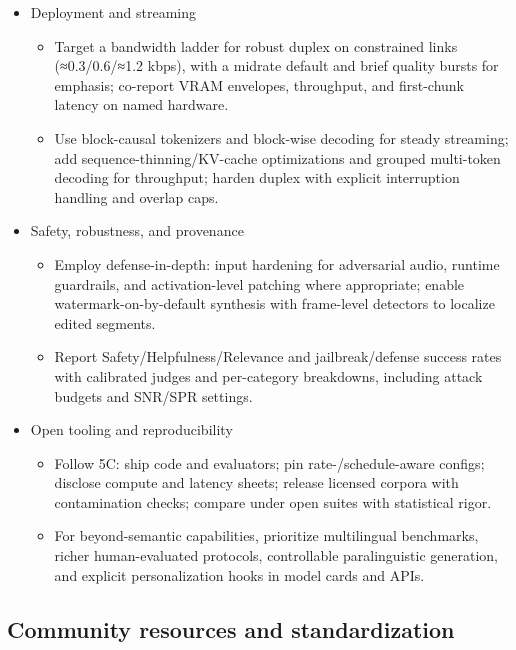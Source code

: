 \documentclass{article}
\begin{document}
\begin{itemize}
  \item Deployment and streaming
  \begin{itemize}
    \item Target a bandwidth ladder for robust duplex on constrained links (≈0.3/0.6/≈1.2 kbps), with a midrate default and brief quality bursts for emphasis; co-report VRAM envelopes, throughput, and first-chunk latency on named hardware.
    \item Use block-causal tokenizers and block-wise decoding for steady streaming; add sequence-thinning/KV-cache optimizations and grouped multi-token decoding for throughput; harden duplex with explicit interruption handling and overlap caps.
  \end{itemize}

  \item Safety, robustness, and provenance
  \begin{itemize}
    \item Employ defense-in-depth: input hardening for adversarial audio, runtime guardrails, and activation-level patching where appropriate; enable watermark-on-by-default synthesis with frame-level detectors to localize edited segments.
    \item Report Safety/Helpfulness/Relevance and jailbreak/defense success rates with calibrated judges and per-category breakdowns, including attack budgets and SNR/SPR settings.
  \end{itemize}

  \item Open tooling and reproducibility
  \begin{itemize}
    \item Follow 5C: ship code and evaluators; pin rate-/schedule-aware configs; disclose compute and latency sheets; release licensed corpora with contamination checks; compare under open suites with statistical rigor.
    \item For beyond-semantic capabilities, prioritize multilingual benchmarks, richer human-evaluated protocols, controllable paralinguistic generation, and explicit personalization hooks in model cards and APIs.
  \end{itemize}

\end{itemize}



\subsection{Community resources and standardization} \label{subsec:Community resources and standardization}
\end{document}
